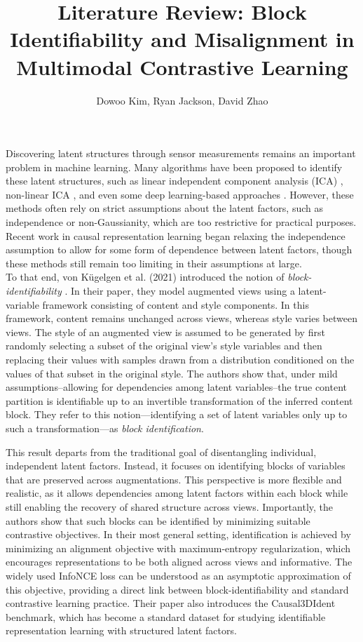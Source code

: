 \documentclass[a4paper,12pt]{article}
\title{Literature Review: Block Identifiability and Misalignment in Multimodal Contrastive Learning}
\author{Dowoo Kim, Ryan Jackson, David Zhao}
\begin{document}
\maketitle

Discovering latent structures through sensor measurements remains an important problem in machine learning. Many algorithms have been proposed to identify these latent structures, such as linear independent component analysis (ICA) \cite{Comon1994} \cite{HyvarinenOja2000}, non-linear ICA \cite{pmlr-v89-hyvarinen19a}, and even some deep learning-based approaches \cite{Bengio2013}. However, these methods often rely on strict assumptions about the latent factors, such as independence or non-Gaussianity, which are too restrictive for practical purposes. Recent work in causal representation learning \cite{scholkopf2021causalrepresentationlearning} began relaxing the independence assumption to allow for some form of dependence between latent factors, though these methods still remain too limiting in their assumptions at large. \\

To that end, von Kügelgen et al. (2021) introduced the notion of \textit{block-identifiability} \cite{von2021self}. In their paper, they model augmented views using a latent-variable framework consisting of content and style components. In this framework, content remains unchanged across views, whereas style varies between views. The style of an augmented view is assumed to be generated by first randomly selecting a subset of the original view’s style variables and then replacing their values with samples drawn from a distribution conditioned on the values of that subset in the original style. The authors show that, under mild assumptions–allowing for dependencies among latent variables–the true content partition is identifiable up to an invertible transformation of the inferred content block. They refer to this notion—identifying a set of latent variables only up to such a transformation—as \textit{block identification}.

This result departs from the traditional goal of disentangling individual, independent latent factors. Instead, it focuses on identifying blocks of variables that are preserved across augmentations. This perspective is more flexible and realistic, as it allows dependencies among latent factors within each block while still enabling the recovery of shared structure across views. Importantly, the authors show that such blocks can be identified by minimizing suitable contrastive objectives. In their most general setting, identification is achieved by minimizing an alignment objective with maximum-entropy regularization, which encourages representations to be both aligned across views and informative. The widely used InfoNCE loss can be understood as an asymptotic approximation of this objective, providing a direct link between block-identifiability and standard contrastive learning practice. Their paper also introduces the Causal3DIdent benchmark, which has become a standard dataset for studying identifiable representation learning with structured latent factors. \\
\end{document}
